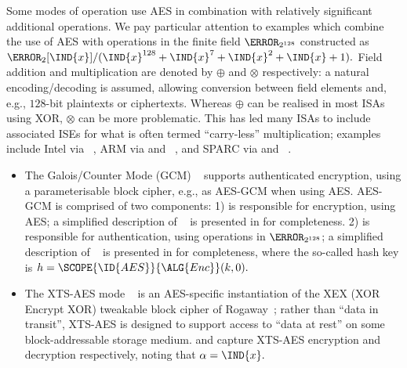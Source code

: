 Some modes of operation use AES in combination with relatively
  significant 
additional operations.  
We pay particular attention to examples which combine the use of AES with
operations in the finite field $\F_{2^{128}}$ constructed as
$
\F_{2}[\IND{x}] / ( \IND{x}^{128} + \IND{x}^{7} + \IND{x}^{2} + \IND{x} + 1 ) .
$
Field 
      addition
and
multiplication
are denoted by
$\oplus$
and
$\otimes$
respectively:
a natural encoding/decoding is assumed, allowing conversion between field 
elements and, e.g., $128$-bit plaintexts or ciphertexts.
Whereas $\oplus$ can be realised in most ISAs using XOR, $\otimes$ can be
more problematic.  This has led many ISAs to include associated ISEs for
what is often termed ``carry-less'' multiplication; 
examples include
Intel via ~\cite[Page 4-241]{X86:2:18},
ARM   via  and ~\cite[Section C7.2.215]{ARMv8-A:20},
and
SPARC via  and ~\cite[Section 7.143]{SPARC:16}.

\begin{itemize}
\item The Galois/Counter Mode (GCM)
      ~\cite{NIST:sp.800.38d}
      supports authenticated encryption, using a parameterisable block cipher,
      e.g., as AES-GCM when using AES.
      AES-GCM is comprised of two components:
      1)    
            is responsible for 
                encryption,
            using AES; 
            a simplified description of
            ~\cite[Algorithm 3]{NIST:sp.800.38d}
            is presented in
            for completeness.
      2)    
            is responsible for
            authentication,
            using operations in $\F_{2^{128}}$;
            a simplified description of
            ~\cite[Algorithm 2]{NIST:sp.800.38d}
            is presented in
            for completeness,
            where the so-called hash key is
            $
            h = \SCOPE{\ID{AES}}{\ALG{Enc}}( k, 0 ) .
            $
\item The XTS-AES mode 
      ~\cite{NIST:sp.800.38e}
      is an AES-specific instantiation of the XEX (XOR Encrypt XOR) tweakable
      block cipher of Rogaway~\cite{Rogaway:04};
      rather than ``data in transit'', XTS-AES is designed to support access
      to ``data at rest'' on some block-addressable storage medium.
      and
      capture XTS-AES encryption and decryption respectively, noting that 
      $
      \alpha = \IND{x} .
      $
\end{itemize}


